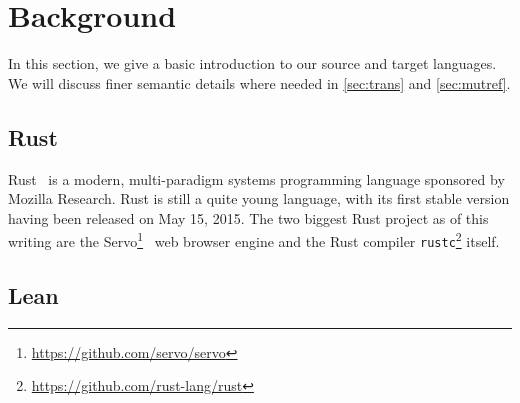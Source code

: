 \section{Background}
In this section, we give a basic introduction to our source and target
languages. We will discuss finer semantic details where needed in
\autoref{sec:trans} and \autoref{sec:mutref}.

\subsection{Rust}

Rust~\cite{matsakis2014rust} is a modern, multi-paradigm systems programming language sponsored
by Mozilla Research. Rust is still a quite young language, with its first stable
version having been released on May 15, 2015. The two biggest Rust project as of
this writing are the Servo\footnote{\url{https://github.com/servo/servo}}~\cite{anderson2016engineering} web browser engine and
the Rust compiler \texttt{rustc}\footnote{\url{https://github.com/rust-lang/rust}} itself.

\subsection{Lean}
